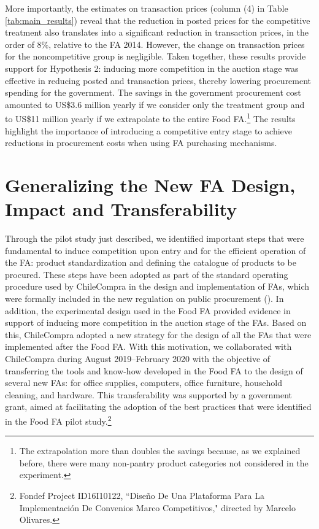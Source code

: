 More importantly, the estimates on transaction prices (column (4) in Table \ref{tab:main_results}) reveal that the reduction in posted prices for the competitive treatment also translates into a significant reduction in transaction prices, in the order of 8\%, relative to the FA 2014. However, the {change} on transaction prices for the noncompetitive group is negligible. Taken together, these results provide support for Hypothesis 2: inducing more competition in the auction stage was effective in reducing posted and transaction prices, thereby lowering procurement spending for the government.  The savings in the government procurement cost amounted to US\$3.6 million  yearly if we  consider only the treatment group and to US\$11 million yearly if we extrapolate to the
entire Food FA.\footnote{The extrapolation more than doubles the savings because, as we explained before, there were many non-pantry product categories not considered in the experiment.} The results highlight the importance of introducing  a competitive entry stage to achieve reductions in procurement costs when using FA purchasing mechanisms.



\section{{Generalizing the New FA Design, Impact and Transferability}}


 
 Through the pilot study just described, we identified important steps that were fundamental to induce competition upon entry and for the efficient operation of the FA:  product standardization and defining the catalogue of products to be procured. These steps have been adopted as part of the standard operating procedure used by ChileCompra in the design and implementation of FAs, which were formally included in the new regulation on public procurement (\cite{leycompras}). In addition, the experimental design used in the Food FA provided evidence in support of inducing more competition in the auction stage of the FAs. Based on this, ChileCompra adopted a new strategy for the design of all the FAs that were implemented after the Food FA.
 With this motivation, we collaborated with ChileCompra during August 2019--February 2020 with the objective of transferring the tools and know-how developed in the Food FA to the design of several new FAs: for office supplies, computers, office furniture, household cleaning, and hardware. This transferability was supported by a government grant, aimed at facilitating the adoption of the best practices that were identified in the Food FA pilot study.\footnote{Fondef Project ID16I10122, ``Diseño De Una Plataforma Para La Implementación De Convenios Marco Competitivos," directed by Marcelo Olivares.}

